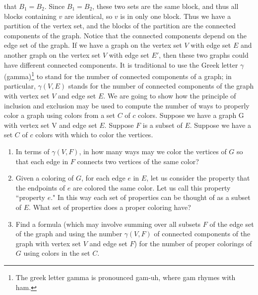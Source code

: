 that
$B_1=B_2$.\label{conncomp}
\ep
Since $B_1=B_2$, these two sets are the same block, and thus all blocks
containing $v$ are identical, so $v$ is in only one block.  Thus we have
a partition of the vertex set, and the blocks of the partition are the
connected components of the graph.  Notice that the connected components
depend on the edge set of the graph.  If we have a graph on the vertex
set $V$ with edge set
$E$ and another graph on the vertex set
$V$ with edge set $E'$, then these two graphs could have different
connected components.  It is traditional to use the Greek letter
$\gamma$ (gamma)\footnote{The greek  letter gamma is pronounced gam-uh,
where gam rhymes with ham.} to stand for the number of connected
components of a graph; in particular,  $\gamma(V,E)$ stands for the
number of connected components of the graph with vertex set $V$ and edge
set $E$.  We are going to show how the principle of inclusion and
exclusion may be used to compute the number of ways to properly color a
graph using colors from a set $C$ of $c$ colors.  
\bp  
\itemes Suppose  we have a graph G with vertex set V and edge set $E$. 
Suppose $F$ is a subset of $E$.  Suppose we have a set $C$ of $c$ colors
with which to color the vertices.
\begin{enumerate}
  \item In terms of $\gamma(V,F)$, in how many
ways may we color the vertices of $G$ so that each edge in $F$ connects
two vertices of the same color?
  \item Given a coloring of $G$, for each edge $e$ in $E$, let us consider
the property that the endpoints of $e$ are colored the same color.  Let us
call this property ``property $e$."  In this way each set of properties
can be thought of as a subset of $E$.  What set of properties does a
proper coloring have?  
\item Find a formula (which may involve summing over all subsets $F$ of
the edge set of the graph and using the number $\gamma(V,F)$ of connected
components of the graph with vertex set $V$ and edge set $F$) for the
number of proper colorings of
$G$ using colors in the set $C$.\label{chromaticpoly}
\end{enumerate}

